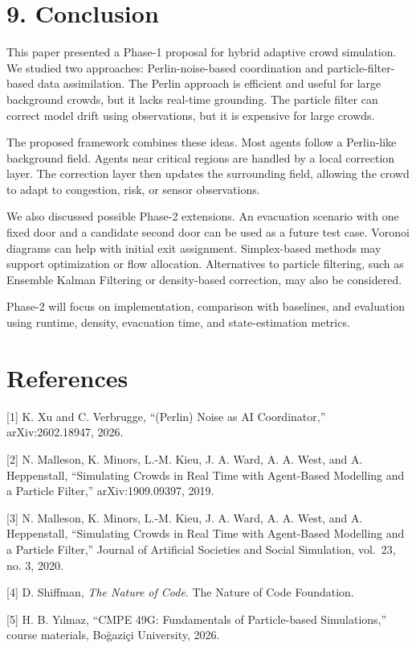 \documentclass[
  11pt,
]{article}
\begin{document}
\section{9. Conclusion}\label{conclusion}

This paper presented a Phase-1 proposal for hybrid adaptive crowd
simulation. We studied two approaches: Perlin-noise-based coordination
and particle-filter-based data assimilation. The Perlin approach is
efficient and useful for large background crowds, but it lacks real-time
grounding. The particle filter can correct model drift using
observations, but it is expensive for large crowds.

The proposed framework combines these ideas. Most agents follow a
Perlin-like background field. Agents near critical regions are handled
by a local correction layer. The correction layer then updates the
surrounding field, allowing the crowd to adapt to congestion, risk, or
sensor observations.

We also discussed possible Phase-2 extensions. An evacuation scenario
with one fixed door and a candidate second door can be used as a future
test case. Voronoi diagrams can help with initial exit assignment.
Simplex-based methods may support optimization or flow allocation.
Alternatives to particle filtering, such as Ensemble Kalman Filtering or
density-based correction, may also be considered.

Phase-2 will focus on implementation, comparison with baselines, and
evaluation using runtime, density, evacuation time, and state-estimation
metrics.

\section{References}\label{references}

{[}1{]} K. Xu and C. Verbrugge, ``(Perlin) Noise as AI Coordinator,''
arXiv:2602.18947, 2026.

{[}2{]} N. Malleson, K. Minors, L.-M. Kieu, J. A. Ward, A. A. West, and
A. Heppenstall, ``Simulating Crowds in Real Time with Agent-Based
Modelling and a Particle Filter,'' arXiv:1909.09397, 2019.

{[}3{]} N. Malleson, K. Minors, L.-M. Kieu, J. A. Ward, A. A. West, and
A. Heppenstall, ``Simulating Crowds in Real Time with Agent-Based
Modelling and a Particle Filter,'' Journal of Artificial Societies and
Social Simulation, vol.~23, no. 3, 2020.

{[}4{]} D. Shiffman, \emph{The Nature of Code}. The Nature of Code
Foundation.

{[}5{]} H. B. Yılmaz, ``CMPE 49G: Fundamentals of Particle-based
Simulations,'' course materials, Boğaziçi University, 2026.
\end{document}
